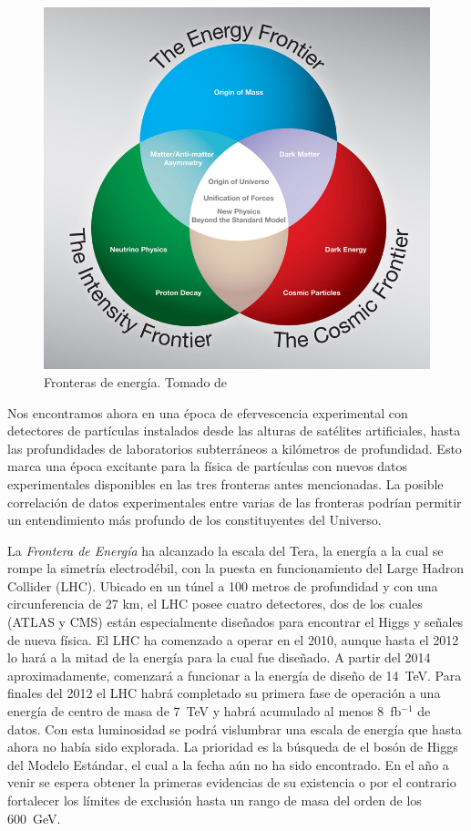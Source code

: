 \begin{figure}
  \centering
\includegraphics[scale=0.3]{three-frontiers-large}
  \caption{Fronteras de energía. Tomado de \cite{fermilab}}
  \label{fig:1}
\end{figure}

Nos encontramos ahora en una época de efervescencia experimental con
detectores de partículas instalados desde las alturas de satélites
artificiales, hasta las profundidades de laboratorios subterráneos a
kilómetros de profundidad. Esto marca una época excitante para la
física de partículas con nuevos datos experimentales disponibles en
las tres fronteras antes mencionadas. La posible correlación de datos
experimentales entre varias de las fronteras podrían permitir un
entendimiento más profundo de los constituyentes del Universo.

La \emph{Frontera de Energía} ha alcanzado la escala del Tera, la
energía a la cual se rompe la simetría electrodébil, con la puesta en
funcionamiento del Large Hadron Collider (LHC). Ubicado en un túnel a
100 metros de profundidad y con una circunferencia de 27 km, el LHC
posee cuatro detectores, dos de los cuales (ATLAS y CMS) están
especialmente diseñados para encontrar el Higgs y señales de nueva física. El LHC
ha comenzado a operar en el 2010, aunque hasta el 2012 lo hará a la
mitad de la energía para la cual fue diseñado. A partir del 2014
aproximadamente, comenzará a funcionar a la energía de diseño de
14~TeV. Para finales del 2012 el LHC habrá completado su primera fase
de operación a una energía de centro de masa de 7~TeV y habrá
acumulado al menos 8~fb$^{-1}$ de datos. Con esta luminosidad se podrá
vislumbrar una escala de energía que hasta ahora no había sido
explorada. La prioridad es la búsqueda de el bosón de Higgs del Modelo Estándar,
el cual a la fecha aún no ha sido encontrado. En el año a venir
se espera obtener la primeras evidencias de su existencia o
por el contrario fortalecer los límites de exclusión hasta un rango de masa
del orden de los 600~GeV.

